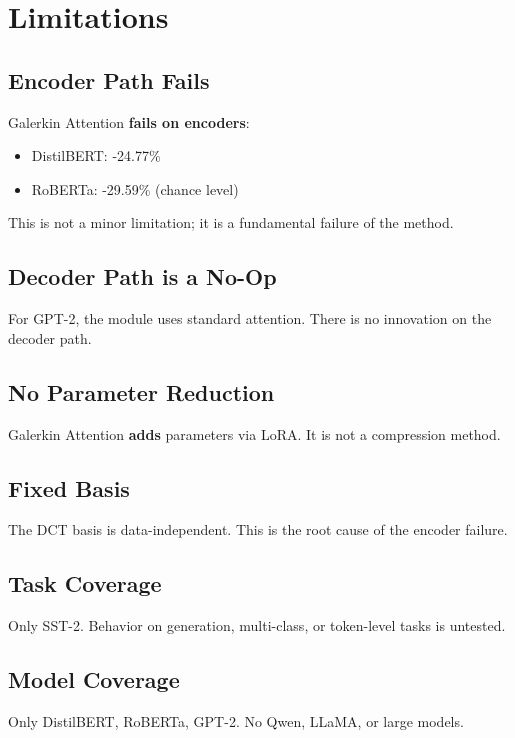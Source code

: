 
\section{Limitations}

\subsection{Encoder Path Fails}

Galerkin Attention \textbf{fails on encoders}:
\begin{itemize}
\item DistilBERT: -24.77\%
\item RoBERTa: -29.59\% (chance level)

\end{itemize}
This is not a minor limitation; it is a fundamental failure of the method.

\subsection{Decoder Path is a No-Op}

For GPT-2, the module uses standard attention. There is no innovation on 
the decoder path.

\subsection{No Parameter Reduction}

Galerkin Attention \textbf{adds} parameters via LoRA. It is not a compression 
method.

\subsection{Fixed Basis}

The DCT basis is data-independent. This is the root cause of the encoder 
failure.

\subsection{Task Coverage}

Only SST-2. Behavior on generation, multi-class, or token-level tasks 
is untested.

\subsection{Model Coverage}

Only DistilBERT, RoBERTa, GPT-2. No Qwen, LLaMA, or large models.


